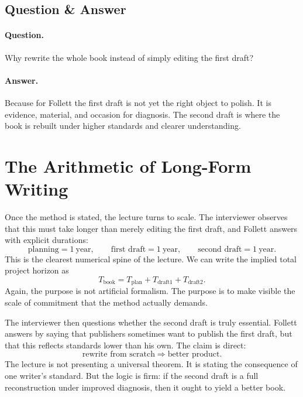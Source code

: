 \subsection{Question \& Answer}

\paragraph{Question.} Why rewrite the whole book instead of simply editing the first draft?

\paragraph{Answer.} Because for Follett the first draft is not yet the right object to polish. It is evidence, material, and occasion for diagnosis. The second draft is where the book is rebuilt under higher standards and clearer understanding.

\section{The Arithmetic of Long-Form Writing}

Once the method is stated, the lecture turns to scale. The interviewer observes that this must take longer than merely editing the first draft, and Follett answers with explicit durations:
\begin{equation}
\text{planning} = 1\ \text{year}, \qquad
\text{first draft} = 1\ \text{year}, \qquad
\text{second draft} = 1\ \text{year}.
\end{equation}
This is the clearest numerical spine of the lecture. We can write the implied total project horizon as
\begin{equation}
T_{\text{book}} = T_{\text{plan}} + T_{\text{draft1}} + T_{\text{draft2}}.
\end{equation}
Again, the purpose is not artificial formalism. The purpose is to make visible the scale of commitment that the method actually demands.

The interviewer then questions whether the second draft is truly essential. Follett answers by saying that publishers sometimes want to publish the first draft, but that this reflects standards lower than his own. The claim is direct:
\begin{equation}
\text{rewrite from scratch} \Rightarrow \text{better product}.
\end{equation}
The lecture is not presenting a universal theorem. It is stating the consequence of one writer's standard. But the logic is firm: if the second draft is a full reconstruction under improved diagnosis, then it ought to yield a better book.

